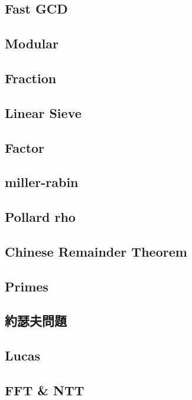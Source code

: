 \subsection{Fast GCD}

\subsection{Modular}

\subsection{Fraction}

\subsection{Linear Sieve}

\subsection{Factor}

\subsection{miller-rabin}

\subsection{Pollard rho}

\subsection{Chinese Remainder Theorem}

\subsection{Primes}

\subsection{約瑟夫問題}

\subsection{Lucas}

\subsection{FFT \& NTT}


